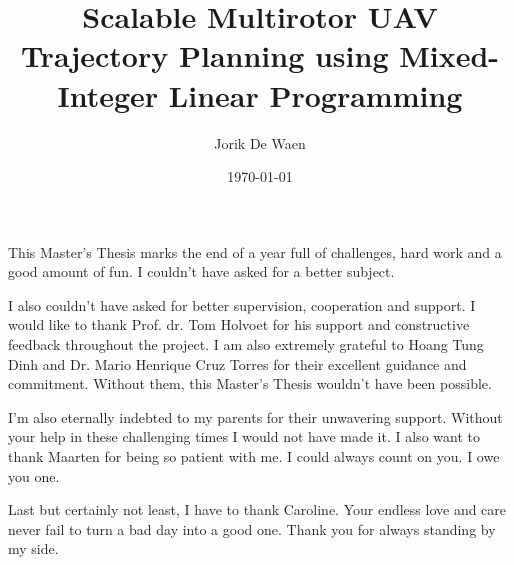 \documentclass[
master=cws,
masteroption=ai,
english,
]{kulemt}
\title{Scalable Multirotor UAV Trajectory Planning using Mixed-Integer Linear Programming}
\author{Jorik De Waen}
\date{\today}
\begin{document}
\begin{preface}
This Master's Thesis marks the end of a year full of challenges, hard work and a good amount of fun. I couldn't have asked for a better subject.
\par
I also couldn't have asked for better supervision, cooperation and support. I would like to thank Prof. dr. Tom Holvoet for his support and constructive feedback throughout the project. I am also extremely grateful to Hoang Tung Dinh and Dr. Mario Henrique Cruz Torres for their excellent guidance and commitment. Without them, this Master's Thesis wouldn't have been possible.
\par
I'm also eternally indebted to my parents for their unwavering support. Without your help in these challenging times I would not have made it. I also want to thank Maarten for being so patient with me. I could always count on you. I owe you one. 
\par
Last but certainly not least, I have to thank Caroline. Your endless love and care never fail to turn a bad day into a good one. Thank you for always standing by my side.
\par

\end{preface}

\tableofcontents*
\end{document}
